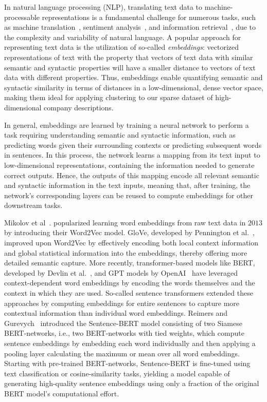 \documentclass[conference]{IEEEtran}
\begin{document}
In natural language processing (NLP), translating text data to machine-processable representations is a fundamental challenge for numerous tasks, such as machine translation~\cite{qi2018and}, sentiment analysis~\cite{rezaeinia2019sentiment}, and information retrieval~\cite{ye2016word}, due to the complexity and variability of natural language. A popular approach for representing text data is the utilization of so-called \emph{embeddings}: vectorized representations of text with the property that vectors of text data with similar semantic and syntactic properties will have a smaller distance to vectors of text data with different properties. Thus, embeddings enable quantifying semantic and syntactic similarity in terms of distances in a low-dimensional, dense vector space, making them ideal for applying clustering to our sparse dataset of high-dimensional company descriptions.  

In general, embeddings are learned by training a neural network to perform a task requiring understanding semantic and syntactic information, such as predicting words given their surrounding contexts or predicting subsequent words in sentences. In this process, the network learns a mapping from its text input to low-dimensional representations, containing the information needed to generate correct outputs. Hence, the outputs of this mapping encode all relevant semantic and syntactic information in the text inputs, meaning that, after training, the network's corresponding layers can be reused to compute embeddings for other downstream tasks.

Mikolov et al~\cite{mikolov2013efficient}. popularized learning word embeddings from raw text data in $2013$ by introducing their Word2Vec model. GloVe, developed by Pennington et al.~\cite{pennington2014glove}, improved upon Word2Vec by effectively encoding both local context information and global statistical information into the embeddings, thereby offering more detailed semantic capture. More recently, transformer-based models like BERT, developed by Devlin et al.~\cite{devlin2018bert}, and GPT models by OpenAI~\cite{radford2018improving} have leveraged context-dependent word embeddings by encoding the words themselves and the context in which they are used. So-called sentence transformers extended these approaches by computing embeddings for entire sentences to capture more contextual information than individual word embeddings. Reimers and Gurevych~\cite{reimers2019sentence} introduced the Sentence-BERT model consisting of two Siamese BERT-networks, i.e., two BERT-networks with tied weights, which compute sentence embeddings by embedding each word individually and then applying a pooling layer calculating the maximum or mean over all word embeddings. Starting with pre-trained BERT-networks, Sentence-BERT is fine-tuned using text classification or cosine-similarity tasks, yielding a model capable of generating high-quality sentence embeddings using only a fraction of the original BERT model's computational effort.
\end{document}
